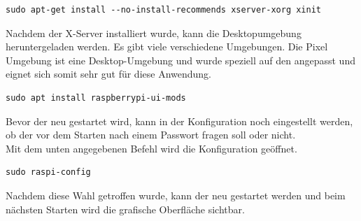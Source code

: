 \begin{verbatim}
sudo apt-get install --no-install-recommends xserver-xorg xinit
\end{verbatim}
\vspace{3mm}
Nachdem der X-Server installiert wurde, kann die Desktopumgebung heruntergeladen werden. Es gibt viele verschiedene Umgebungen. Die Pixel Umgebung ist eine Desktop-Umgebung und wurde speziell auf den \raspi angepasst und eignet sich somit sehr gut für diese Anwendung.\\
\vspace{3mm}
\begin{verbatim}
sudo apt install raspberrypi-ui-mods
\end{verbatim}
\vspace{3mm}
Bevor der \raspi neu gestartet wird, kann in der Konfiguration noch eingestellt werden, ob der \raspi vor dem Starten nach einem Passwort fragen soll oder nicht.\\
Mit dem unten angegebenen Befehl wird die Konfiguration\autocite{raspberry_Konfiguartion} geöffnet.
\vspace{3mm}
\begin{verbatim}
sudo raspi-config
\end{verbatim}
\vspace{3mm}
Nachdem diese Wahl getroffen wurde, kann der \raspi neu gestartet werden und beim nächsten Starten wird die grafische Oberfläche sichtbar.
